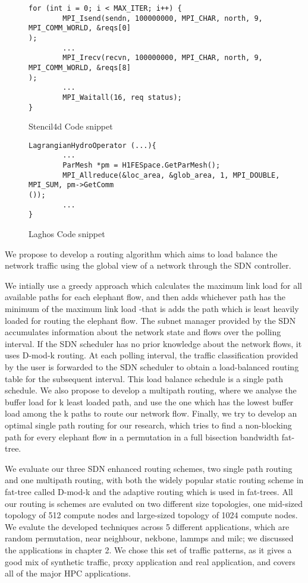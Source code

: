 \begin{figure}[hbtp]
\caption{Stencil4d Code snippet}
\label{code.stencil}
\begin{lstlisting}[breaklines]
for (int i = 0; i < MAX_ITER; i++) {
        MPI_Isend(sendn, 100000000, MPI_CHAR, north, 9, MPI_COMM_WORLD, &reqs[0]
);
        ...
        MPI_Irecv(recvn, 100000000, MPI_CHAR, north, 9, MPI_COMM_WORLD, &reqs[8]
);
        ...
        MPI_Waitall(16, req status);
}
\end{lstlisting}
\end{figure}



\begin{figure}[hbtp]
\caption{Laghos Code snippet}
\label{code.laghos}
\begin{lstlisting}[breaklines]
LagrangianHydroOperator (...){
        ...
        ParMesh *pm = H1FESpace.GetParMesh();
        MPI_Allreduce(&loc_area, &glob_area, 1, MPI_DOUBLE, MPI_SUM, pm->GetComm
());
        ...
}
\end{lstlisting}
\end{figure}

We propose to develop a routing algorithm which aims to load balance the network traffic using the 
global view of a network through the SDN controller.

We intially use a greedy approach which calculates the maximum link load for all available
paths for each elephant flow, and then adds whichever path has the minimum of the maximum link load 
-that is adds the path which is least heavily loaded for routing the elephant flow. 
The subnet manager provided by the SDN accumulates information
about the network state and flows over the polling interval. If the SDN
scheduler has no prior knowledge about the network flows, it uses D-mod-k routing.
At each polling interval, the traffic classification provided by the user is forwarded to the SDN scheduler 
to obtain a load-balanced routing table for the subsequent interval. This load balance schedule is a single 
path schedule. We also propose to develop a multipath routing, where we analyse the buffer load for k least loaded
path, and use the one which has the lowest buffer load among the k paths to route our network flow. Finally,
we try to develop an optimal single path routing for our research, which tries to find a non-blocking path for 
every elephant flow in a permutation in a full bisection bandwidth fat-tree.

We evaluate our three SDN enhanced routing schemes, two single path routing and one multipath
routing, with both the widely popular static routing scheme in fat-tree called D-mod-k and the adaptive 
routing which is used in fat-trees. All our routing is schemes are evaluted on two different size
topologies, one mid-sized topology of 512 compute nodes and large-sized topology of 1024 compute
nodes. We evalute the developed techniques across 5 different applications, which are random permutation,
near neighbour, nekbone, lammps and milc; we discussed the applications in chapter 2. 
We chose this set of traffic patterns, as it gives a good mix 
of synthetic traffic, proxy application and real application, and covers all of the major HPC applications.

